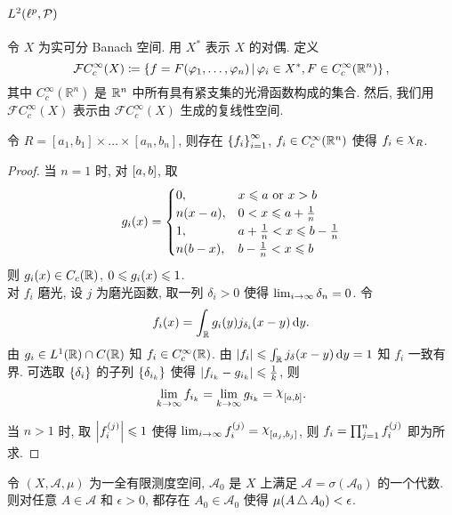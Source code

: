 \section{\texorpdfstring{$L^2(\ell^p,\mathcal{P})$}{}}
令 $X$ 为实可分 Banach 空间. 用 $X^*$ 表示 $X$ 的对偶. 定义
\[\mathcal{F}C^\infty_c(X)\coloneqq\left\{f=F(\varphi_1,\dots,\varphi_n)\,\middle\vert\,\varphi_i\in X^*, F\in C^\infty_c(\mathbb{R}^n)\right\},\]
其中 $C^\infty_c(\mathbb{R}^n)$ 是 $\mathbb{R}^n$ 中所有具有紧支集的光滑函数构成的集合. 然后, 我们用 $\mathscr{F}C^\infty_c(X)$ 表示由 $\mathcal{F}C^\infty_c(X)$ 生成的复线性空间.
\begin{lemma}
令 $R=[a_1,b_1]\times\dots\times[a_n,b_n]$, 则存在 $\left\{f_i\right\}^\infty_{i=1}$, $f_i\in C^\infty_c(\mathbb{R}^n)$ 使得 $f_i\in\rchi_R$.
\end{lemma}
\begin{proof}
当 $n=1$ 时, 对 $\left[a,b\right]$, 取
\[g_i\xk{x}=
\begin{cases}
0,&x\leq a\ \text{or}\ x>b\\
n(x-a),& 0<x\leq a+\frac{1}{n}\\
1,& a+\frac{1}{n}<x\leq b-\frac{1}{n}\\
n(b-x),& b-\frac{1}{n}<x\leq b
\end{cases}
\]
则 $g_i\xk{x}\in C_c\xk{\rr}$, $0\leq g_i\xk{x}\leq 1$.\\
对 $f_i$ 磨光, 设 $j$ 为磨光函数, 取一列 $\delta_i>0$ 使得 $\lim_{i\to\infty}\delta_n=0$. 令
\[f_i\xk{x}=\int_{\rr}g_i\xk{y}j_{\delta_{i}}(x-y)\dd y.\]
由 $g_i\in L^1\xk{\rr}\cap C\xk{\rr}$ 知 $f_i\in\cci\xk{\rr}$. 由 $\jd{f_i}\leq\int_{\rr}j_{\delta}\xk{x-y}\dd y=1$ 知 $f_i$ 一致有界. 可选取 $\left\{\delta_i\right\}$ 的子列 $\left\{\delta_{i_{k}}\right\}$ 使得 $\left\vert f_{i_{k}}-g_{i_{k}}\right\vert\leqslant\frac{1}{k}$, 则
\[\lim _{k\toi}f_{i_{k}}=\lim _{k\toi}g_{i_{k}}=\rchi_{\zk{a,b}}.\]

当 $n>1$ 时, 取 $\left\vert f_i^{\left(j\right)}\right\vert\leqslant 1$ 使得 $\lim _{i\toi}f_{i}^{\xk{j}}=\rchi_{\zk{a_j,b_j}}$, 则 $f_i=\prod_{j=1}^{n}f_{i}^{\left(j\right)}$ 即为所求.
\end{proof}
\begin{lemma}
\label{duichencha}
令 $(X,\mathscr{A},\mu)$ 为一全有限测度空间, $\mathscr{A}_0$ 是 $X$ 上满足 $\mathscr{A}=\sigma(\mathscr{A}_0)$ 的一个代数. 则对任意 $A\in\mathscr{A}$ 和 $\epsilon>0$, 都存在 $A_0\in\mathscr{A}_0$ 使得 $\mu(A\operatorname{\triangle} A_0)<\epsilon$.
\end{lemma}
